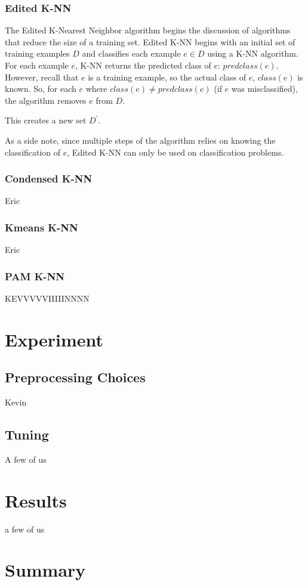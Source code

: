 \documentclass[twoside,11pt]{article}
\begin{document}
\subsubsection{Edited K-NN}
The Edited K-Nearest Neighbor algorithm begins the discussion of algorithms that reduce the size of a training set. Edited K-NN begins with an initial set of training examples $D$ and classifies each example $e \in D$ using a K-NN algorithm. For each example $e$, K-NN returns the predicted class of $e$: $predclass(e)$. However, recall that $e$ is a training example, so the actual class of $e$, $class(e)$ is known. So, for each $e$ where $class(e) \neq predclass(e)$ (if $e$ was misclassified), the algorithm removes $e$ from $D$.

This creates a new set $D^\prime$. 

As a side note, since multiple steps of the algorithm relies on knowing the classification of $e$, Edited K-NN can only be used on classification problems.



\subsubsection{Condensed K-NN}

Eric

\subsubsection{Kmeans K-NN}

Eric

\subsubsection{PAM K-NN}

KEVVVVVIIIIINNNN

\section{Experiment}

\subsection{Preprocessing Choices}

Kevin

\subsection{Tuning}

A few of us

\section{Results}

a few of us

\section{Summary}




\end{document}
